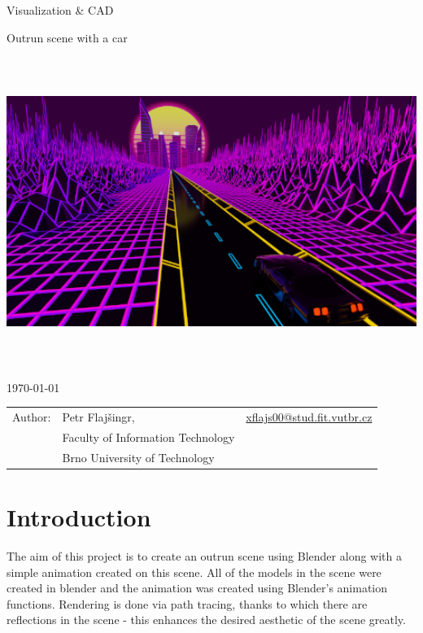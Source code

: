 \documentclass[12pt,a4paper,titlepage,final]{report}
\makeatletter
\newcommand\Course{Visualization \& CAD}
\newcommand\WorkTitle{Outrun scene with a car}
\newcommand\Author{Petr Flajšingr}
\newcommand\AuthorEmail{xflajs00@stud.fit.vutbr.cz}
\newcommand\Faculty{Faculty of Information Technology}
\newcommand\School{Brno University of Technology}
\makeatother
\begin{document}
	\begin{titlepage}
	\begin{center}
		\begin{Large}
			\Course\\
		\end{Large}
		\bigskip
		\begin{Huge}
			\WorkTitle\\
		\end{Huge}
	\end{center}
	\vfill
	\begin{center}
		\includegraphics[height=10cm]{images/render_small.png}
	\end{center}
	\vfill
	\begin{center}
		\begin{large}
			\today
		\end{large}
	\end{center}
	\vfill
	\begin{flushleft}
		\begin{large}
			\begin{tabular}{lll}
				Author: & \Author, & \url{\AuthorEmail} \\
				& \Faculty \\
				& \School \\
			\end{tabular}
		\end{large}
	\end{flushleft}
\end{titlepage}		

\tableofcontents
\newpage

\section{Introduction}
The aim of this project is to create an outrun scene using Blender along with a simple animation created on this scene. All of the models in the scene were created in blender and the animation was created using Blender's animation functions. Rendering is done via path tracing, thanks to which there are reflections in the scene - this enhances the desired aesthetic of the scene greatly.
\end{document}
